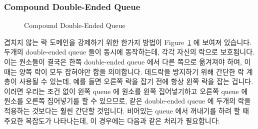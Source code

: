 \subsubsection{Compound Double-Ended Queue}
\label{sec:SMPdesign:Compound Double-Ended Queue}

\begin{figure}[tb]
\centering
{}
\caption{Compound Double-Ended Queue}
\label{fig:SMPdesign:Compound Double-Ended Queue}
\end{figure}

겹치지 않는 락 도메인을 강제하기 위한 한가지 방법이
Figure~\ref{fig:SMPdesign:Compound Double-Ended Queue}
에 보여져 있습니다.
두개의 double-ended queue 들이 동시에 동작하는데, 각각 자신의 락으로
보호됩니다.
이는 원소들이 결국은 한쪽 double-ended queue 에서 다른 쪽으로 옮겨져야 하며,
이때는 양쪽 락이 모두 잡혀야만 함을 의미합니다.
데드락을 방지하기 위해 간단한 락 계층이 사용될 수 있는데, 예를 들면 오른쪽 락을
잡기 전에 항상 왼쪽 락을 잡는 겁니다.
이러면 우리는 조건 없이 왼쪽 queue 에 원소를 왼쪽 집어넣기하고 오른쪽 queue 에
원소를 오른쪽 집어넣기를 할 수 있으므로, 같은 double-ended queue 에 두개의 락을
적용하는 것보다는 훨씬 간단할 것입니다.
비어있는 queue 에서 꺼내기를 하려 할 때 주요한 복잡도가 나타나는데, 이 경우에는
다음과 같은 처리가 필요합니다:

